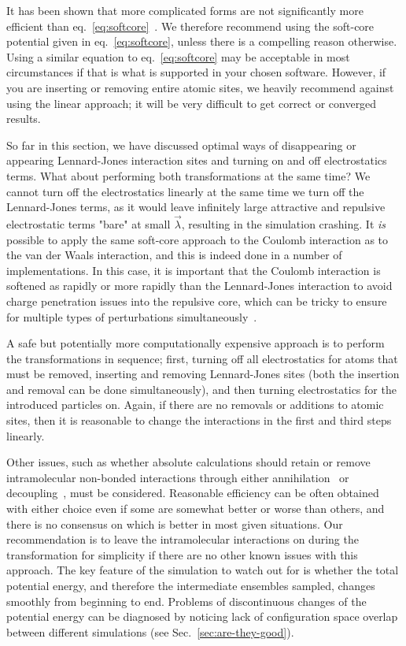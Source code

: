 \documentclass[9pt,bestpractices]{livecoms}
\begin{document}
It has been shown that more complicated forms are not significantly more efficient than eq.~\ref{eq:softcore}~\cite{pham2012optimal}. We therefore recommend using the soft-core potential given in eq.~\ref{eq:softcore}, unless there is a compelling reason otherwise. Using a similar equation to eq.~\ref{eq:softcore} may be acceptable in most circumstances if that is what is supported in your chosen software. However, if you are inserting or removing entire atomic sites, we heavily recommend against using the linear approach; it will be very difficult to get correct or converged results. 

So far in this section, we have discussed optimal ways of disappearing or appearing Lennard-Jones interaction sites and turning on and off electrostatics terms. What about performing both transformations at the same time? We cannot turn off the electrostatics linearly at the same time we turn off the Lennard-Jones terms, as it would leave infinitely large attractive and repulsive electrostatic terms "bare" at small $\vec{\lambda}$, resulting in the simulation crashing. It \textit{is} possible to apply the same soft-core approach to the Coulomb interaction as to the van der Waals interaction, and this is indeed done in a number of implementations. In this case, it is important that the Coulomb interaction is softened as rapidly or more rapidly than the Lennard-Jones interaction to avoid charge penetration issues into the repulsive core, which  can be tricky to ensure for multiple types of perturbations simultaneously~\cite{steinbrecher2011softcore}. 

A safe but potentially more computationally expensive approach is to perform the transformations in sequence; first, turning off all electrostatics for atoms that must be removed, inserting and removing Lennard-Jones sites (both the insertion and removal can be done simultaneously), and then turning electrostatics for the introduced particles on. Again, if there are no removals or additions to atomic sites, then it is reasonable to change the interactions in the first and third steps  linearly. 

Other issues, such as whether absolute calculations should retain or remove intramolecular non-bonded interactions
through either annihilation~\cite{hermans1997inclusion, mann2000modeling, boresch2003absolute, wang2006absolute, mobley2006use} or decoupling~\cite{fujitani2005direct, mobley2006use}, must be considered. Reasonable efficiency can be often obtained with either choice even if some are somewhat better or worse than others, and there is no consensus on which is better in most given situations. Our recommendation is to leave the intramolecular interactions on during the transformation for simplicity if there are no other known issues with this approach. The key feature of the simulation to watch out for is whether the total potential energy, and therefore the intermediate ensembles sampled, changes smoothly from beginning to end. Problems of discontinuous changes of the potential energy can be diagnosed by noticing lack of configuration space overlap between different simulations (see Sec.~\ref{sec:are-they-good}).
\end{document}

